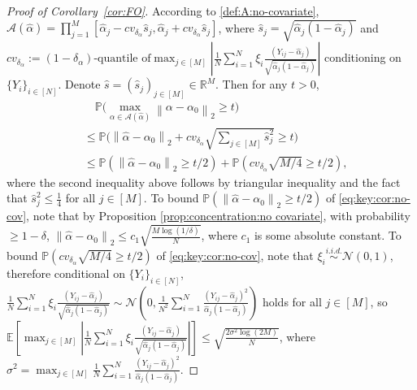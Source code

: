 \documentclass[11pt]{article}
\newcommand{\norm}[1]{\left\lVert #1 \right\rVert}
\begin{document}
\begin{proof}[Proof of Corollary~\ref{cor:FO}]
According to \eqref{def:A:no-covariate}, $\mathcal{A}(\hat\alpha) =\prod_{j=1}^M [\hat\alpha_j - cv_{\delta_\alpha} \hat s_j, \hat\alpha_j + cv_{\delta_\alpha} \hat s_j]$, where $\hat s_j= \sqrt{\hat\alpha_j(1-\hat\alpha_j)}$ and $cv_{\delta_\alpha} := (1-\delta_\alpha)\mbox{-quantile of} \max_{j\in[M]} \left| \frac{1}{N}\sum_{i=1}^N \xi_i \frac{(Y_{ij} - \hat \alpha_j)}{\sqrt{\hat\alpha_j(1-\hat\alpha_j)}}\right|$ conditioning on $\{Y_i\}_{i\in[N]}$. 
Denote $\hat{s}=(\hat{s}_j)_{j\in[M]}\in\mathbb{R}^M$. Then for any $t>0$, 
\begin{equation}\label{eq:key:cor:no-cov}
\begin{array}{rl}
&\quad\displaystyle\mathbb{P}\bigg(\displaystyle\max_{\alpha\in\mathcal{A}(\hat{\alpha})}\norm{\alpha -\alpha_0}_2\geq t\bigg)\\
&\leq\mathbb{P}\bigg(\norm{\hat{\alpha}-\alpha_0}_2+cv_{\delta_{\alpha}}\sqrt{\sum_{j\in[M]}\hat{s}_j^2}\geq t\bigg)\\
&\displaystyle\leq\mathbb{P}(\norm{\hat{\alpha}-\alpha_0}_2\geq t/2)+\mathbb{P}(cv_{\delta_{\alpha}}\sqrt{M/4}\geq t/2),
\end{array}
\end{equation}
where the second inequality above follows by triangular inequality and the fact that $\hat{s}_j^2\leq\frac{1}{4}$ for all $j\in[M]$. To bound $\mathbb{P}(\norm{\hat{\alpha}-\alpha_0}_2\geq t/2)$ of \eqref{eq:key:cor:no-cov}, note that by Proposition \ref{prop:concentration:no covariate}, with probability $\geq1-\delta$, $\norm{\hat{\alpha}-\alpha_0}_2\leq c_1\sqrt{\frac{M\log(1/\delta)}{N}}$, where $c_1$ is some absolute constant. To bound $\mathbb{P}(cv_{\delta_{\alpha}}\sqrt{M/4}\geq t/2)$ of \eqref{eq:key:cor:no-cov}, note that $\xi_i\overset{i.i.d.}{\sim}\mathcal{N}(0,1)$, therefore conditional on $\{Y_i\}_{i\in[N]}$, 
$\frac{1}{N}\sum_{i=1}^N\xi_i\frac{(Y_{ij}-\hat{\alpha}_j)}{\sqrt{\hat{\alpha}_j(1-\hat{\alpha}_j)}}\sim\mathcal{N}\left(0,\frac{1}{N^2}\sum_{i=1}^N\frac{(Y_{ij}-\hat{\alpha}_j)^2}{\hat{\alpha}_j(1-\hat{\alpha}_j)}\right)$ holds for all $j\in[M]$, so $\mathbb{E}\left[\max_{j\in[M]}\left|\frac{1}{N}\sum_{i=1}^N\xi_i\frac{(Y_{ij}-\hat{\alpha}_j)}{\sqrt{\hat{\alpha}_j(1-\hat{\alpha}_j)}}\right|\right]\leq\sqrt{\frac{2\sigma^2\log(2M)}{N}}$, where $\sigma^2=\max_{j\in[M]}\frac{1}{N}\sum_{i=1}^N\frac{(Y_{ij}-\hat{\alpha}_j)^2}{\hat{\alpha}_j(1-\hat{\alpha}_j)}$.

\end{proof}
\end{document}
